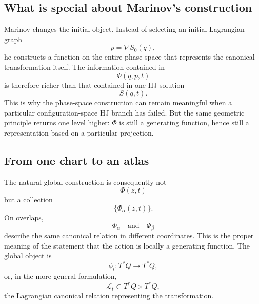 \subsection{What is special about Marinov's construction}
Marinov changes the initial object.
Instead of selecting an initial Lagrangian graph
\begin{equation}
p=\nabla S_0(q),
\end{equation}
he constructs a function on the entire phase space that represents the
canonical transformation itself.
The information contained in
\begin{equation}
\Phi(q,p,t)
\end{equation}
is therefore richer than that contained in one HJ solution
\begin{equation}
S(q,t).
\end{equation}
This is why the phase-space construction can remain meaningful when a
particular configuration-space HJ branch has failed.
But the same geometric principle returns one level higher: \(\Phi\) is still
a generating function, hence still a representation based on a particular
projection.
\subsection{From one chart to an atlas}
The natural global construction is consequently not
\begin{equation}
\Phi(z,t)
\end{equation}
but a collection
\begin{equation}
\{\Phi_\alpha(z,t)\}.
\end{equation}
On overlaps,
\begin{equation}
\Phi_\alpha
\quad\text{and}\quad
\Phi_\beta
\end{equation}
describe the same canonical relation in different coordinates.
This is the proper meaning of the statement that the action is locally a
generating function.
The global object is
\begin{equation}
\boxed{
\phi_t:T^*Q\rightarrow T^*Q,
}
\end{equation}
or, in the more general formulation,
\begin{equation}
\boxed{
\mathcal L_t\subset T^*Q\times T^*Q,
}
\end{equation}
the Lagrangian canonical relation representing the transformation.
